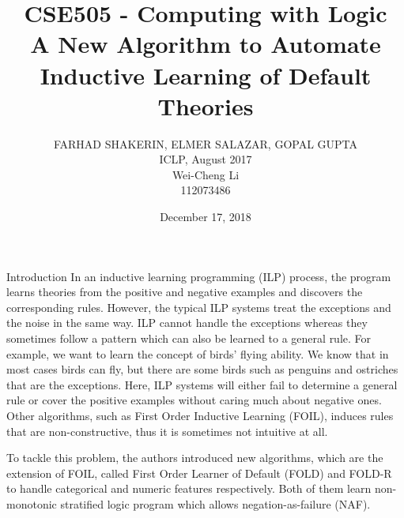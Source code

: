 \documentclass[12pt,a4paper]{article}
\title{
	{\bf CSE505 - Computing with Logic
	\\\vspace{1em}
	A New Algorithm to Automate Inductive Learning of Default Theories}
}
\author{
	FARHAD SHAKERIN, ELMER SALAZAR, GOPAL GUPTA\\
	\vspace{1em}
	ICLP, August 2017\\
	Wei-Cheng Li\\
	112073486
}
\date{December 17, 2018}
\begin{document}
	\maketitle
	
	\begin{section}{Introduction}
	In an inductive learning programming (ILP) process, the program learns theories from the positive and negative examples and discovers the corresponding rules. However, the typical ILP systems treat the exceptions and the noise in the same way. ILP cannot handle the exceptions whereas they sometimes follow a pattern which can also be learned to a general rule. For example, we want to learn the concept of birds’ flying ability. We know that in most cases birds can fly, but there are some birds such as penguins and ostriches that are the exceptions. Here, ILP systems will either fail to determine a general rule or cover the positive examples without caring much about negative ones. Other algorithms, such as First Order Inductive Learning (FOIL), induces rules that are non-constructive, thus it is sometimes not intuitive at all.

	To tackle this problem, the authors introduced new algorithms, which are the extension of FOIL, called First Order Learner of Default (FOLD)\cite{FOLD} and FOLD-R to handle categorical and numeric features respectively. Both of them learn non-monotonic stratified logic program which allows negation-as-failure (NAF).
	\end{section}
\end{document}

